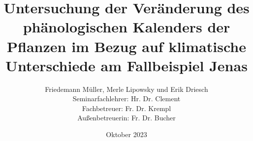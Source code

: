 \documentclass[12pt]{report}
\title{Untersuchung der Veränderung des phänologischen Kalenders der Pflanzen im Bezug auf klimatische Unterschiede am Fallbeispiel Jenas}
\institute{Staatliche Gemeinschaftsschule Kaleidoskop Jena}
\author{Friedemann Müller, Merle Lipowsky und Erik Driesch  
\\      \small Seminarfachlehrer: Hr. Dr. Clement 
\\      \small Fachbetreuer: Fr. Dr. Krempl 
\\      \small Außenbetreuerin: Fr. Dr. Bucher}
\date{Oktober 2023}
\begin{document}
\maketitle
\renewcommand{\contentsname}{Inhaltsverzeichnis}
\tableofcontents
\newpage









%
%
\end{document}

